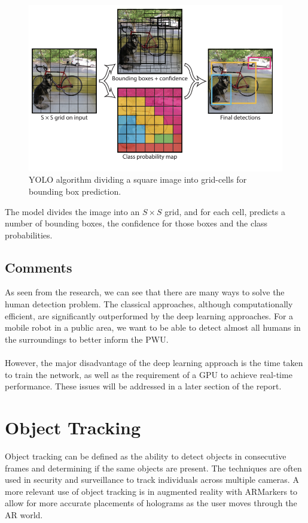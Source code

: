 \begin{figure}[ht]
	\centering
	\includegraphics[width=.6\linewidth]{img/chapter2_background/yoloApproach.png}
	\caption{YOLO algorithm dividing a square image into grid-cells for bounding box prediction.}
\end{figure}

The model divides the image into an $S \times S$ grid, and for each cell, predicts a number of bounding boxes, the confidence for those boxes and the class probabilities.

\subsection{Comments} \label{sec:detector}
As seen from the research, we can see that there are many ways to solve the human detection problem. The classical approaches, although computationally efficient, are significantly outperformed by the deep learning approaches. For a mobile robot in a public area, we want to be able to detect almost all humans in the surroundings to better inform the PWU.

\paragraph{}However, the major disadvantage of the deep learning approach is the time taken to train the network, as well as the requirement of a GPU to achieve real-time performance. These issues will be addressed in a later section of the report.

\section{Object Tracking}
Object tracking can be defined as the ability to detect objects in consecutive frames and determining if the same objects are present. The techniques are often used in security and surveillance to track individuals across multiple cameras. A more relevant use of object tracking is in augmented reality with ARMarkers to allow for more accurate placements of holograms as the user moves through the AR world.

